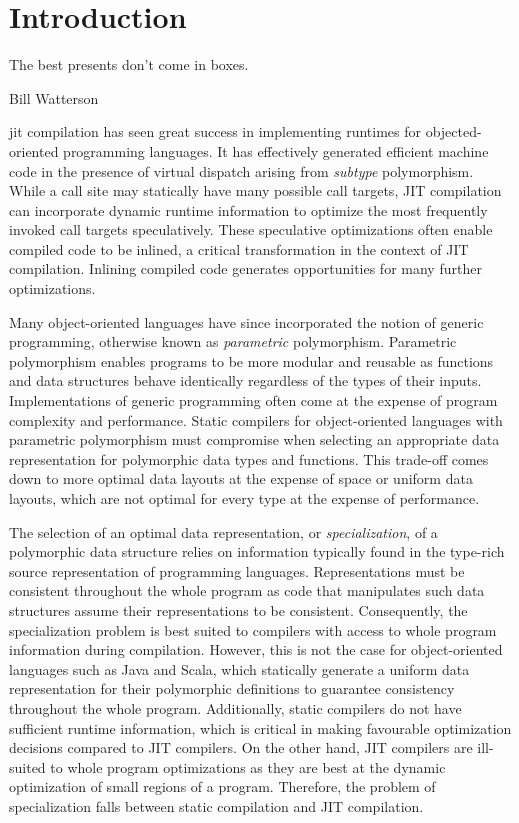 \chapter{Introduction}

\epigraph{The best presents don't come in boxes.}{Bill Watterson}

\acrfull{jit} compilation has seen great success in implementing runtimes for objected-oriented programming languages.
It has effectively generated efficient machine code in the presence of virtual dispatch arising from \textit{subtype} polymorphism\cite{smalltalk:inline-caches,self:polymorphic-inline-caches}.
While a call site may statically have many possible call targets, JIT compilation can incorporate dynamic runtime information to optimize the most frequently invoked call targets speculatively.
These speculative optimizations often enable compiled code to be inlined, a critical transformation in the context of JIT compilation.
Inlining compiled code generates opportunities for many further optimizations.

Many object-oriented languages have since incorporated the notion of generic programming, otherwise known as \textit{parametric} polymorphism.
Parametric polymorphism enables programs to be more modular and reusable as functions and data structures behave identically\cite{tapl} regardless of the types of their inputs.
Implementations of generic programming often come at the expense of program complexity and performance.
Static compilers for object-oriented languages with parametric polymorphism must compromise when selecting an appropriate data representation for polymorphic data types and functions.
This trade-off comes down to more optimal data layouts at the expense of space or uniform data layouts, which are not optimal for every type at the expense of performance.

The selection of an optimal data representation, or \textit{specialization}, of a polymorphic data structure relies on information typically found in the type-rich source representation of programming languages.
Representations must be consistent throughout the whole program as code that manipulates such data structures assume their representations to be consistent.
Consequently, the specialization problem is best suited to compilers with access to whole program information during compilation.
However, this is not the case for object-oriented languages such as Java and Scala, which statically generate a uniform data representation for their polymorphic definitions to guarantee consistency throughout the whole program. 
Additionally, static compilers do not have sufficient runtime information, which is critical in making favourable optimization decisions compared to JIT compilers.
On the other hand, JIT compilers are ill-suited to whole program optimizations as they are best at the dynamic optimization of small regions of a program\cite{history:jit}.
Therefore, the problem of specialization falls between static compilation and JIT compilation.

